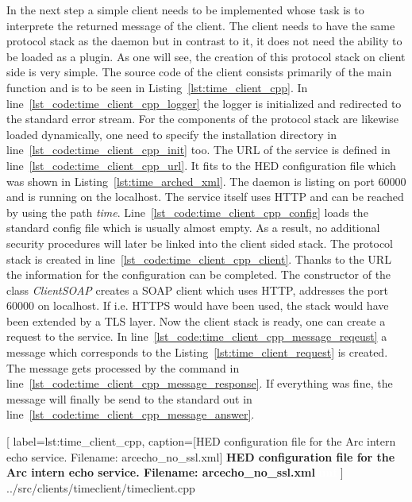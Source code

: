 In the next step a simple client needs to be implemented whose task is to interprete the returned message of the client.
The client needs to have the same protocol stack as the daemon but in contrast to it, it does not need the ability to be loaded as a plugin. As one will see, the creation of this protocol stack on client side is very simple.
The source code of the client consists primarily of the main function and is to be seen in Listing~\ref{lst:time_client_cpp}.
In line~\ref{lst_code:time_client_cpp_logger} the logger is initialized and redirected to the standard error stream.
For the components of the protocol stack are likewise loaded dynamically, one need to specify the installation directory in line~\ref{lst_code:time_client_cpp_init} too.
The URL of the service is defined in line~\ref{lst_code:time_client_cpp_url}. It fits to the HED configuration file which was shown in Listing~\ref{lst:time_arched_xml}. The daemon is listing on port 60000 and is running on the localhost. The service itself uses HTTP and can be reached by using the path \textit{time}.
Line~\ref{lst_code:time_client_cpp_config} loads the standard config file which is usually almost empty. As a result, no additional security procedures will later be linked into the client sided stack. The protocol stack is created in line~\ref{lst_code:time_client_cpp_client}. Thanks to the URL the information for the configuration can be completed.
The constructor of the class \textit{ClientSOAP} creates a SOAP client which uses HTTP, addresses the port 60000 on localhost. If i.e. HTTPS would have been used, the stack would have been extended by a TLS layer.
Now the client stack is ready, one can create a request to the service. In line~\ref{lst_code:time_client_cpp_message_reqeust} a message which corresponds to the Listing~\ref{lst:time_client_request} is created. The message gets processed by the command in line~\ref{lst_code:time_client_cpp_message_response}. If everything was fine, the message will finally be send to the standard out in line~\ref{lst_code:time_client_cpp_message_answer}.


	[
	label=lst:time_client_cpp,
	caption={[HED configuration file for the Arc intern echo service. Filename: arcecho\_no\_ssl.xml]
	\textbf{HED configuration file for the Arc intern echo service. Filename: arcecho\_no\_ssl.xml\textcolor{white}{hmf}}}
	]
{../src/clients/timeclient/timeclient.cpp}



